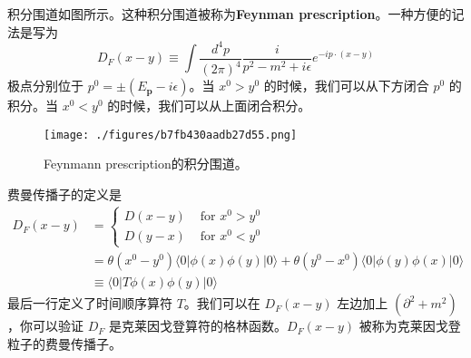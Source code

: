 积分围道如图所示。这种积分围道被称为\textbf{Feynman prescription}。一种方便的记法是写为
\begin{equation}
D_F(x-y) \equiv \int \frac{d^4p}{(2\pi)^4} \frac{i}{p^2-m^2+i\epsilon} e^{-ip\cdot(x-y)}
\end{equation}
极点分别位于 $p^0 = \pm(E_{\mathbf p}-i\epsilon)$。当 $x^0>y^0$ 的时候，我们可以从下方闭合 $p^0$ 的积分。当 $x^0<y^0$ 的时候，我们可以从上面闭合积分。
\begin{figure}[ht]
\centering
\texttt{[image: ./figures/b7fb430aadb27d55.png]}
\caption{Feynmann prescription的积分围道。} \label{fig_Klein_2}
\end{figure}
费曼传播子的定义是
\begin{equation}\label{eq_Klein_3}
\begin{aligned}
D_{F}(x-y) &= \begin{cases}D(x-y) & \text { for } x^{0}>y^{0} \\
D(y-x) & \text { for } x^{0}<y^{0}\end{cases} \\
&=\theta\left(x^{0}-y^{0}\right)\langle 0|\phi(x) \phi(y)| 0\rangle+\theta\left(y^{0}-x^{0}\right)\langle 0|\phi(y) \phi(x)| 0\rangle \\
& \equiv\langle 0|T \phi(x) \phi(y)| 0\rangle
\end{aligned}
\end{equation}
最后一行定义了时间顺序算符 $T$。我们可以在 $D_F(x-y)$ 左边加上 $(\partial^2+m^2)$，你可以验证 $D_F$ 是克莱因戈登算符的格林函数。$D_F(x-y)$ 被称为克莱因戈登粒子的费曼传播子。

